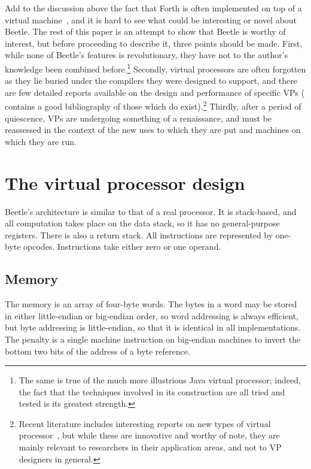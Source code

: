 \documentclass{article}
\begin{document}
Add to the discussion above the fact that Forth is often implemented on top
of a virtual machine~\cite{threaded}, and it is hard to see what could be
interesting or novel about Beetle. The rest of this paper is an attempt to
show that Beetle is worthy of interest, but before proceeding to describe it,
three points should be made. First, while none of Beetle's features is
revolutionary, they have not to the author's knowledge been combined
before.\footnote{The same is true of the much more illustrious Java virtual
processor; indeed, the fact that the techniques involved in its construction
are all tried and tested is its greatest strength.} Secondly, virtual
processors are often forgotten as they lie buried under the compilers they
were designed to support, and there are few detailed reports available on the
design and performance of specific VPs (\cite{intcoproc} contains a good
bibliography of those which do exist).\footnote{Recent literature includes
interesting reports on new types of virtual processor~\cite{virttime}, but
while these are innovative and worthy of note, they are mainly relevant to
researchers in their application areas, and not to VP designers in general.}
Thirdly, after a period of quiescence, VPs are undergoing something of a
renaissance, and must be reassessed in the context of the new uses to which
they are put and machines on which they are run.



\section{The virtual processor design}

Beetle's architecture is similar to that of a real processor. It is
stack-based, and all computation takes place on the data stack, so it has no
general-purpose registers. There is also a return stack. All instructions are
represented by one-byte opcodes. Instructions take either zero or one
operand.


\subsection{Memory}

The memory is an array of four-byte words. The bytes in a word may be stored
in either little-endian or big-endian order, so word addressing is
always efficient, but byte addressing is little-endian, so that it is
identical in all implementations. The penalty is a single machine instruction
on big-endian machines to invert the bottom two bits of the address of a byte
reference.
\end{document}
